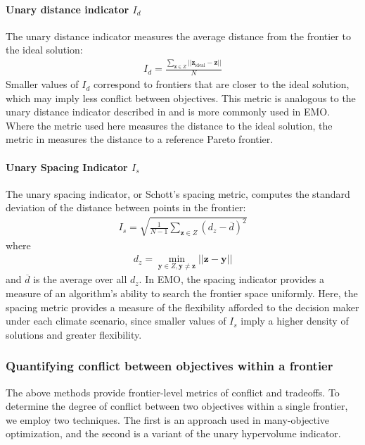 \paragraph{Unary distance indicator $I_d$} The unary distance indicator measures the average distance from the frontier to the ideal solution:
\begin{align}
I_d = \frac{\sum_{\mathbf{z} \in Z} ||\mathbf{z}_{\text{ideal}} - \mathbf{z} ||}{N}
\end{align}
Smaller values of $I_d$ correspond to frontiers that are closer to the ideal solution, which may imply less conflict between objectives. This metric is analogous to the unary distance indicator described in \cite{czyzzak1998pareto} and is more commonly used in EMO. Where the metric used here measures the distance to the ideal solution, the metric in \cite{czyzzak1998pareto} measures the distance to a reference Pareto frontier.

\paragraph{Unary Spacing Indicator $I_s$} The unary spacing indicator, or Schott's spacing metric\cite{schott1995fault}, computes the standard deviation of the distance between points in the frontier:
\begin{align}
I_s = \sqrt{\frac{1}{N-1} \sum_{\mathbf{z} \in Z} (d_z - \overbar{d})^2}
\end{align}
where
\begin{align}
d_z = \min_{\mathbf{y} \in Z, \mathbf{y} \neq \mathbf{z}} ||\mathbf{z} - \mathbf{y}||
\end{align}
and $\overbar{d}$ is the average over all $d_z$. In EMO, the spacing indicator provides a measure of an algorithm's ability to search the frontier space uniformly. Here, the spacing metric provides a measure of the flexibility afforded to the decision maker under each climate scenario, since smaller values of $I_s$ imply a higher density of solutions and greater flexibility.

\subsubsection{Quantifying conflict between objectives within a frontier}

The above methods provide frontier-level metrics of conflict and tradeoffs. To determine the degree of conflict between two objectives within a single frontier, we employ two techniques. The first is an approach used in many-objective optimization, and the second is a variant of the unary hypervolume indicator.

